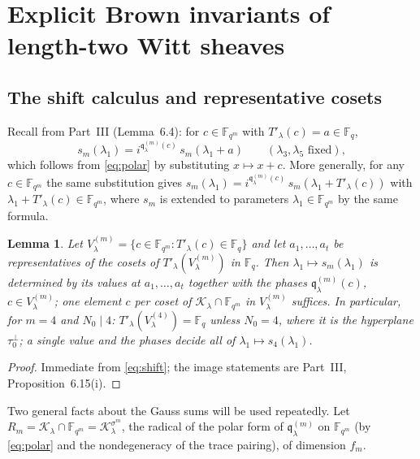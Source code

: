 \documentclass[12pt,a4paper]{amsart}
\newtheorem{lemma}[theorem]{Lemma}
\theoremstyle{definition}
\newcommand{\F}{\mathbb{F}}
\newcommand{\Kk}{\mathcal{K}}
\newcommand{\qq}{\mathfrak{q}}
\begin{document}
\section{Explicit Brown invariants of length-two Witt sheaves}\label{sec:brown}

\subsection{The shift calculus and representative cosets}
Recall from Part~III (Lemma~6.4): for $c\in\F_{q^m}$ with $T'_\lambda(c)=a\in\F_q$,
\begin{equation}\label{eq:shift}
s_m(\lambda_1)=i^{\qq^{(m)}_\lambda(c)}\,s_m(\lambda_1+a)\qquad(\lambda_3,\lambda_5\text{ fixed}),
\end{equation}
which follows from \eqref{eq:polar} by substituting $x\mapsto x+c$. More generally, for any $c\in\F_{q^m}$ the same substitution gives $s_m(\lambda_1)=i^{\qq^{(m)}_\lambda(c)}\,s_m(\lambda_1+T'_\lambda(c))$ with $\lambda_1+T'_\lambda(c)\in\F_{q^m}$, where $s_m$ is extended to parameters $\lambda_1\in\F_{q^m}$ by the same formula.

\begin{lemma}\label{lem:coset}
Let $V^{(m)}_\lambda=\{c\in\F_{q^m}:T'_\lambda(c)\in\F_q\}$ and let $a_1,\dots,a_t$ be representatives of the cosets of $T'_\lambda(V^{(m)}_\lambda)$ in $\F_q$. Then $\lambda_1\mapsto s_m(\lambda_1)$ is determined by its values at $a_1,\dots,a_t$ together with the phases $\qq^{(m)}_\lambda(c)$, $c\in V^{(m)}_\lambda$; one element $c$ per coset of $\Kk_\lambda\cap\F_{q^m}$ in $V^{(m)}_\lambda$ suffices. In particular, for $m=4$ and $N_0\mid4$: $T'_\lambda(V^{(4)}_\lambda)=\F_q$ unless $N_0=4$, where it is the hyperplane $\tau_0^\perp$; a single value and the phases decide all of $\lambda_1\mapsto s_4(\lambda_1)$.
\end{lemma}
\begin{proof}
Immediate from \eqref{eq:shift}; the image statements are Part~III, Proposition~6.15(i).
\end{proof}

Two general facts about the Gauss sums will be used repeatedly. Let $R_m=\Kk_\lambda\cap\F_{q^m}=\Kk_\lambda^{\sigma^m}$, the radical of the polar form of $\qq^{(m)}_\lambda$ on $\F_{q^m}$ (by \eqref{eq:polar} and the nondegeneracy of the trace pairing), of dimension $f_m$.
\end{document}
